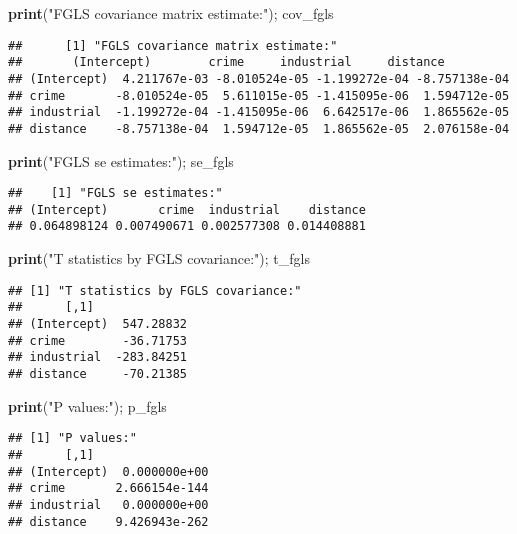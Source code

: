 \documentclass[
  12pt,
]{article}
\newenvironment{Shaded}{\begin{snugshade}}{\end{snugshade}}
\newcommand{\KeywordTok}[1]{\textcolor[rgb]{0.13,0.29,0.53}{\textbf{#1}}}
\newcommand{\NormalTok}[1]{#1}
\newcommand{\StringTok}[1]{\textcolor[rgb]{0.31,0.60,0.02}{#1}}
\begin{document}
\begin{Shaded}
\begin{Highlighting}[]
\KeywordTok{print}\NormalTok{(}\StringTok{"FGLS covariance matrix estimate:"}\NormalTok{); cov\_fgls}
\end{Highlighting}
\end{Shaded}

\begin{Verbatim}
##      [1] "FGLS covariance matrix estimate:"
##       (Intercept)        crime     industrial     distance
## (Intercept)  4.211767e-03 -8.010524e-05 -1.199272e-04 -8.757138e-04
## crime       -8.010524e-05  5.611015e-05 -1.415095e-06  1.594712e-05
## industrial  -1.199272e-04 -1.415095e-06  6.642517e-06  1.865562e-05
## distance    -8.757138e-04  1.594712e-05  1.865562e-05  2.076158e-04
\end{Verbatim}

\begin{Shaded}
\begin{Highlighting}[]
\KeywordTok{print}\NormalTok{(}\StringTok{"FGLS se estimates:"}\NormalTok{); se\_fgls}
\end{Highlighting}
\end{Shaded}

\begin{Verbatim}
##    [1] "FGLS se estimates:"
## (Intercept)       crime  industrial    distance 
## 0.064898124 0.007490671 0.002577308 0.014408881 
\end{Verbatim}

\begin{Shaded}
\begin{Highlighting}[]
\KeywordTok{print}\NormalTok{(}\StringTok{"T statistics by FGLS covariance:"}\NormalTok{); t\_fgls}
\end{Highlighting}
\end{Shaded}

\begin{Verbatim}
## [1] "T statistics by FGLS covariance:"
##      [,1]
## (Intercept)  547.28832
## crime        -36.71753
## industrial  -283.84251
## distance     -70.21385
\end{Verbatim}

\begin{Shaded}
\begin{Highlighting}[]
\KeywordTok{print}\NormalTok{(}\StringTok{"P values:"}\NormalTok{); p\_fgls}
\end{Highlighting}
\end{Shaded}

\begin{Verbatim}
## [1] "P values:"
##      [,1]
## (Intercept)  0.000000e+00
## crime       2.666154e-144
## industrial   0.000000e+00
## distance    9.426943e-262
\end{Verbatim}
\end{document}
